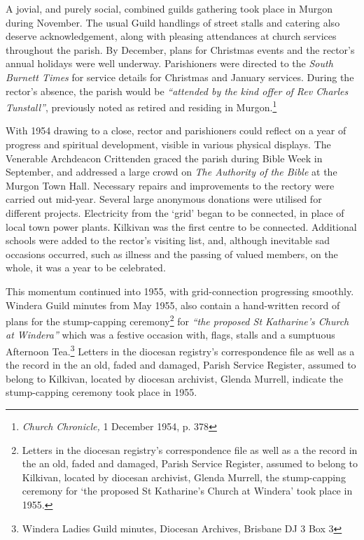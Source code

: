 A jovial, and purely social, combined guilds gathering took place in Murgon during November. The usual Guild handlings of street stalls and catering also deserve acknowledgement, along with pleasing attendances at church services throughout the parish. By December, plans for Christmas events and the rector's annual holidays were well underway. Parishioners were directed to the \emph{South Burnett Times} for service details for Christmas and January services. During the rector's absence, the parish would be \emph{``attended by the kind offer of Rev Charles Tunstall''}, previously noted as retired and residing in Murgon.\footnote{\emph{Church Chronicle,} 1 December 1954, p. 378}


With 1954 drawing to a close, rector and parishioners could reflect on a year of progress and spiritual development, visible in various physical displays. The Venerable Archdeacon Crittenden graced the parish during Bible Week in September, and addressed a large crowd on \emph{The Authority of the Bible} at the Murgon Town Hall\emph{.} Necessary repairs and improvements to the rectory were carried out mid-year. Several large anonymous donations were utilised for different projects. Electricity from the `grid' began to be connected, in place of local town power plants. Kilkivan was the first centre to be connected. Additional schools were added to the rector's visiting list, and, although inevitable sad occasions occurred, such as illness and the passing of valued members, on the whole, it was a year to be celebrated.



This momentum continued into 1955, with grid-connection progressing smoothly. Windera Guild minutes from May 1955, also contain a hand-written record of plans for the stump-capping ceremony\footnote{Letters in the diocesan registry's correspondence file as well as a the record in the an old, faded and damaged, Parish Service Register, assumed to belong to Kilkivan, located by diocesan archivist, Glenda Murrell, the stump-capping ceremony for `the proposed St Katharine's Church at Windera' took place in 1955.} for \emph{``the proposed St Katharine's Church at Windera''} which was a festive occasion with, flags, stalls and a sumptuous Afternoon Tea.\footnote{Windera Ladies Guild minutes, Diocesan Archives, Brisbane DJ 3 Box 3} Letters in the diocesan registry's correspondence file as well as a the record in the an old, faded and damaged, Parish Service Register, assumed to belong to Kilkivan, located by diocesan archivist, Glenda Murrell, indicate the stump-capping ceremony took place in 1955.








